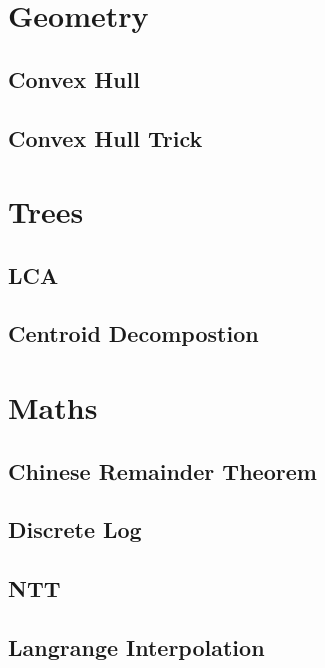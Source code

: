 \section{Geometry}
\subsection{Convex Hull}
\raggedbottom
\subsection{Convex Hull Trick}
\raggedbottom

\section{Trees}
\subsection{LCA}
\raggedbottom
\subsection{Centroid Decompostion}
\raggedbottom

\section{Maths}
\subsection{Chinese Remainder Theorem}
\raggedbottom
\subsection{Discrete Log}
\raggedbottom
\subsection{NTT}
\raggedbottom
\subsection{Langrange Interpolation}
\raggedbottom
